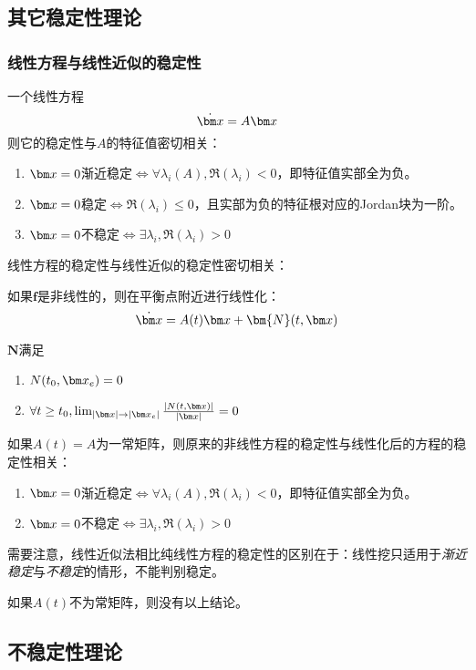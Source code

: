 \subsection{其它稳定性理论}
\subsubsection{线性方程与线性近似的稳定性}
\begin{theorem}[线性ODE方程的稳定性]
一个线性方程
$$\dot{\bx}=A\bx$$
则它的稳定性与$A$的特征值密切相关：
\begin{enumerate}
\item $\bx=0$渐近稳定$\iff \forall \lambda_i(A),\Re(\lambda_i)<0$，即特征值实部全为负。
\item $\bx=0$稳定$\iff \Re(\lambda_i)\leq 0$，且实部为负的特征根对应的Jordan块为一阶。
\item $\bx=0$不稳定$\iff \exists \lambda_i, \Re(\lambda_i)>0$
\end{enumerate}
\end{theorem}

线性方程的稳定性与线性近似的稳定性密切相关：

\begin{theorem}[线性近似的稳定性]
如果$\bm{f}$是非线性的，则在平衡点附近进行线性化：
$$\dot{\bx}=A(t)\bx+\bm{N}(t,\bx)$$

$\bm{N}$满足
\begin{enumerate}
\item $N(t_0, \bx_e)=0$
\item $\forall t\geq t_0,\lim_{|\bx|\rightarrow|\bx_e|}\frac{|N(t,\bx)|}{|\bx|}=0$
\end{enumerate}

如果$A(t)=A$为一常矩阵，则原来的非线性方程的稳定性与线性化后的方程的稳定性相关：
\begin{enumerate}
\item $\bx=0$渐近稳定$\iff \forall \lambda_i(A),\Re(\lambda_i)<0$，即特征值实部全为负。
\item $\bx=0$不稳定$\iff \exists \lambda_i, \Re(\lambda_i)>0$
\end{enumerate}

需要注意，线性近似法相比纯线性方程的稳定性的区别在于：线性挖只适用于\emph{渐近稳定}与\emph{不稳定}的情形，不能判别稳定。

如果$A(t)$不为常矩阵，则没有以上结论。
\end{theorem}




\subsection{不稳定性理论}
